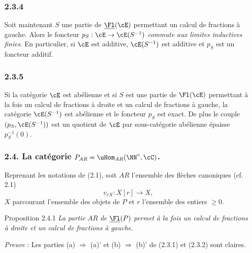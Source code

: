 \subsubsection*{2.3.4}
Soit maintenant $S$ une partie de $\underline{\Fl}(\cE)$ permettant un calcul de fractions à gauche. Alors le foncteur $p_S:\cE\to\cE(S^{-1})$ \emph{commute aux limites inductives finies}. En particulier, si $\cE$ est additive, $\cE(S^{-1})$ est additive et $p_S$ est un foncteur additif.

\subsubsection*{2.3.5}
Si la
catégorie $\cE$ est abélienne et si $S$ est une partie de $\Fl(\cE)$ permettant à la fois un calcul de fractions à droite et un calcul de fractions à gauche, la catégorie $\cE(S^{-1})$ est abélienne et le foncteur $p_S$ est exact. De plus le couple $(p_S,\cE(S^{-1}))$ est un quotient de $\cE$ par sous-catégorie abélienne épaisse $p_S^{-1}(0)$.

\subsubsection*{2.4. La catégorie $P_{AR}=\uHom_{AR}(\NN^\circ,\cC)$.}
Reprenant les notations de (2.1), soit $AR$ l'ensemble des flèches canoniques (cf. 2.1)
\[
v_{rX}:X[r]\longrightarrow X,
\]
$X$ parcourant l'ensemble des objets de $P$ et $r$ l'ensemble des entiers $\ge0$.

\begin{statement}{Proposition 2.4.1}
\emph{La partie} $AR$ \emph{de} $\underline{\Fl}(P)$ \emph{permet à la fois un calcul de fractions à droite et un calcul de fractions à gauche}.
\end{statement}

\emph{Preuve} : Les parties (a) $\Rightarrow$ (a)' et (b) $\Rightarrow$ (b)' de (2.3.1) et (2.3.2) sont claires.

